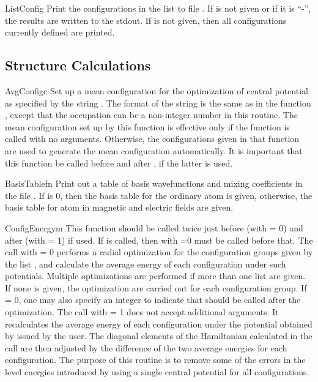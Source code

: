 \begin{fundesc}{ListConfig}{}
Print the configurations in the list  to file . If  is
not given or if it is ``-'', the results are written to the stdout. If 
is not given, then all configurations currently defined are printed.
\end{fundesc}


\subsection{Structure Calculations}

\begin{fundesc}{AvgConfig}{c}
Set up a mean configuration for the optimization of central potential as
specified by the string . The format of the string is the same as in the
function , except that the occupation can be a non-integer
number in this routine. The mean configuration set up by this function is
effective only if the function  is called with no
arguments. Otherwise, the configurations given in that function are used to
generate the mean configuration automatically. It is important that this
function be called before  and after
, if the latter is used.
\end{fundesc}

\begin{fundesc}{BasisTable}{fn}
Print out a table of basis wavefunctions and mixing coefficients in the file
. If  is 0, then the basis table for the ordinary atom is
given, otherwise, the basis table for atom in magnetic and electric fields are
given.
\end{fundesc}

\begin{fundesc}{ConfigEnergy}{m}
This function should be called twice just before (with  = 0) and after
(with  = 1)  if used. If  is
called, then  with =0 must be called before that.
The call with  = 0 performs a radial optimization for the configuration
groups given by the list , and calculate the average energy of each
configuration under such potentials. Multiple optimizations are performed if
more than one list are given. If none is given, the optimization are carried out
for each configuration group. If  = 0, one may also specify an integer
 to indicate that  should be called after the
optimization. The call with  = 1 does not accept additional arguments. It
recalculates the average energy of each configuration under the potential
obtained by  issued by the user. The diagonal elements
of the Hamiltonian calculated in the  call are then adjusted
by the difference of the two average energies for each configuration. The
purpose of this routine is to remove some of the errors in the level energies
introduced by using a single central potential for all configurations.
\end{fundesc}

